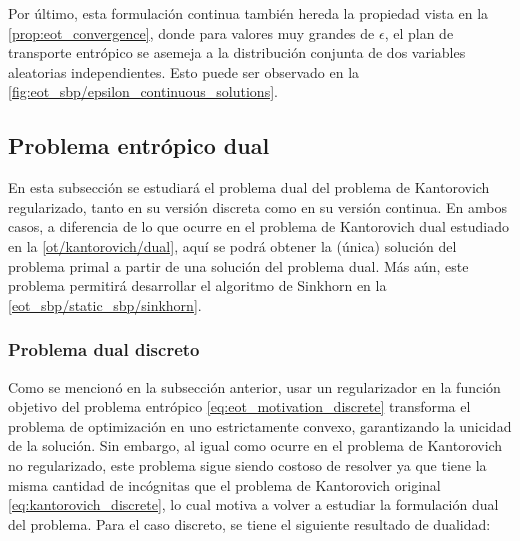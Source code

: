 Por último, esta formulación continua también hereda la propiedad vista en la \autoref{prop:eot_convergence}, donde para valores muy grandes de $\epsilon$, el plan de transporte entrópico se asemeja a la distribución conjunta de dos variables aleatorias independientes. Esto puede ser observado en la \autoref{fig:eot_sbp/epsilon_continuous_solutions}.


\subsection{Problema entrópico dual}
\label{eot_sbp/regularized/eot_dual}

En esta subsección se estudiará el problema dual del problema de Kantorovich regularizado, tanto en su versión discreta como en su versión continua. En ambos casos, a diferencia de lo que ocurre en el problema de Kantorovich dual estudiado en la \autoref{ot/kantorovich/dual}, aquí se podrá obtener la (única) solución del problema primal a partir de una solución del problema dual. Más aún, este problema permitirá desarrollar el algoritmo de Sinkhorn en la \autoref{eot_sbp/static_sbp/sinkhorn}.

\subsubsection{Problema dual discreto}

Como se mencionó en la subsección anterior, usar un regularizador en la función objetivo del problema entrópico \eqref{eq:eot_motivation_discrete} transforma el problema de optimización en uno estrictamente convexo, garantizando la unicidad de la solución. Sin embargo, al igual como ocurre en el problema de Kantorovich no regularizado, este problema sigue siendo costoso de resolver ya que tiene la misma cantidad de incógnitas que el problema de Kantorovich original \eqref{eq:kantorovich_discrete}, lo cual motiva a volver a estudiar la formulación dual del problema. Para el caso discreto, se tiene el siguiente resultado de dualidad:

